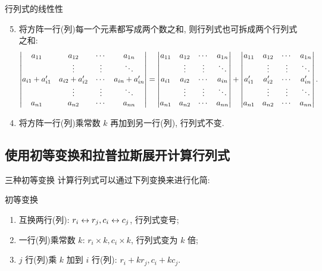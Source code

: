 \begin{frame}{行列式的线性性}
	\onslide<+->
	\begin{alertblock@}
		\begin{enumerate}
			\setcounter{enumi}{4}
			\item 将方阵一行(列)每一个元素都写成两个数之和, 则行列式也可拆成两个行列式之和:
		\[\left|\begin{matrix}a_{11}&a_{12}&\cdots&a_{1n}\\
		&\vdots&\vdots&\ddots\\
		a_{i1}+a'_{i1}&a_{i2}+a'_{i2}&\cdots&a_{in}+a'_{in}\\
		&\vdots&\vdots&\ddots\\
		a_{n1}&a_{n2}&\cdots&a_{nn}\end{matrix}\right|=\left|\begin{matrix}a_{11}&a_{12}&\cdots&a_{1n}\\
		&\vdots&\vdots&\ddots\\
		a_{i1}&a_{i2}&\cdots&a_{in}\\
		&\vdots&\vdots&\ddots\\
		a_{n1}&a_{n2}&\cdots&a_{nn}\end{matrix}\right|+\left|\begin{matrix}a_{11}&a_{12}&\cdots&a_{1n}\\
		&\vdots&\vdots&\ddots\\
		a'_{i1}&a'_{i2}&\cdots&a'_{in}\\
		&\vdots&\vdots&\ddots\\
		a_{n1}&a_{n2}&\cdots&a_{nn}\end{matrix}\right|.\]
		\end{enumerate}
	\end{alertblock@}
	\onslide<+->
	\begin{alertblock@}
		\begin{enumerate}
			\setcounter{enumi}{3}
			\item 将方阵一行(列)乘常数 $k$ 再加到另一行(列), 行列式不变.
		\end{enumerate}
	\end{alertblock@}
\end{frame}


\subsection{使用初等变换和拉普拉斯展开计算行列式}
\begin{frame}{三种初等变换}
	\onslide<+->
	计算行列式可以通过下列变换来进行化简:
	\onslide<+->
	\begin{block}{初等变换}
		\begin{enumerate}
		\item 互换两行(列): \alert{$r_i\leftrightarrow r_j, c_i\leftrightarrow c_j$}, 行列式变号;
		\item 一行(列)乘常数 $k$: \alert{$r_i\times k, c_i\times k$}, 行列式变为 $k$ 倍;
		\item $j$ 行(列)乘 $k$ 加到 $i$ 行(列): \alert{$r_i+kr_j, c_i+kc_j$}.
	\end{enumerate}
	\end{block}
\end{frame}


